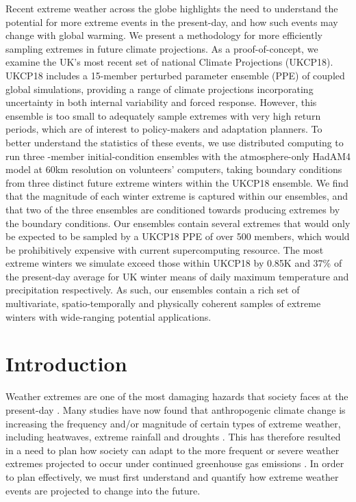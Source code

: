 Recent extreme weather across the globe highlights the need to understand the potential for more extreme events in the present-day, and how such events may change with global warming. We present a methodology for more efficiently sampling extremes in future climate projections. As a proof-of-concept, we examine the UK's most recent set of national Climate Projections (UKCP18). UKCP18 includes a 15-member perturbed parameter ensemble (PPE) of coupled global simulations, providing a range of climate projections incorporating uncertainty in both internal variability and forced response. However, this ensemble is too small to adequately sample extremes with very high return periods, which are of interest to policy-makers and adaptation planners. To better understand the statistics of these events, we use distributed computing to run three -member initial-condition ensembles with the atmosphere-only HadAM4 model at 60km resolution on volunteers' computers, taking boundary conditions from three distinct future extreme winters within the UKCP18 ensemble. We find that the magnitude of each winter extreme is captured within our ensembles, and that two of the three ensembles are conditioned towards producing extremes by the boundary conditions. Our ensembles contain several extremes that would only be expected to be sampled by a UKCP18 PPE of over 500 members, which would be prohibitively expensive with current supercomputing resource. The most extreme winters we simulate exceed those within UKCP18 by 0.85K and 37\% of the present-day average for UK winter means of daily maximum temperature and precipitation respectively. As such, our ensembles contain a rich set of multivariate, spatio-temporally and physically coherent samples of extreme winters with wide-ranging potential applications.

\section{Introduction}

  Weather extremes are one of the most damaging hazards that society faces at the present-day \citep{wef_global_2021}. Many studies have now found that anthropogenic climate change is increasing the frequency and/or magnitude of certain types of extreme weather, including heatwaves, extreme rainfall and droughts \citep{seneviratne_weather_2021}. This has therefore resulted in a need to plan how society can adapt to the more frequent or severe weather extremes projected to occur under continued greenhouse gas emissions \citep{allen_warming_2009,diffenbaugh_quantifying_2017,rahmstorf_increase_2011}. In order to plan effectively, we must first understand and quantify how extreme weather events are projected to change into the future.

